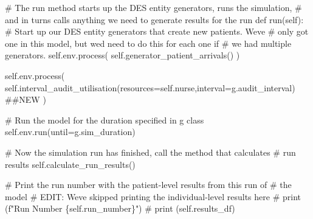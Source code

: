 \documentclass[
  letterpaper,
  DIV=11,
  numbers=noendperiod]{scrreprt}
\newenvironment{Shaded}{\begin{snugshade}}{\end{snugshade}}
\newcommand{\CommentTok}[1]{\textcolor[rgb]{0.37,0.37,0.37}{#1}}
\newcommand{\KeywordTok}[1]{\textcolor[rgb]{0.00,0.23,0.31}{#1}}
\newcommand{\NormalTok}[1]{\textcolor[rgb]{0.00,0.23,0.31}{#1}}
\newcommand{\OperatorTok}[1]{\textcolor[rgb]{0.37,0.37,0.37}{#1}}
\newcommand{\VariableTok}[1]{\textcolor[rgb]{0.07,0.07,0.07}{#1}}
\begin{document}
\begin{Shaded}
\begin{Highlighting}[]
    \CommentTok{\# The run method starts up the DES entity generators, runs the simulation,}
    \CommentTok{\# and in turns calls anything we need to generate results for the run}
        \KeywordTok{def}\NormalTok{ run(}\VariableTok{self}\NormalTok{):}
        \CommentTok{\# Start up our DES entity generators that create new patients.  We\textquotesingle{}ve}
        \CommentTok{\# only got one in this model, but we\textquotesingle{}d need to do this for each one if}
        \CommentTok{\# we had multiple generators.}
        \VariableTok{self}\NormalTok{.env.process(}
          \VariableTok{self}\NormalTok{.generator\_patient\_arrivals()}
\NormalTok{        )}

        \VariableTok{self}\NormalTok{.env.process(}
          \VariableTok{self}\NormalTok{.interval\_audit\_utilisation(resources}\OperatorTok{=}\VariableTok{self}\NormalTok{.nurse,interval}\OperatorTok{=}\NormalTok{g.audit\_interval) }\CommentTok{\#\#NEW}
\NormalTok{        )}

        \CommentTok{\# Run the model for the duration specified in g class}
        \VariableTok{self}\NormalTok{.env.run(until}\OperatorTok{=}\NormalTok{g.sim\_duration)}

        \CommentTok{\# Now the simulation run has finished, call the method that calculates}
        \CommentTok{\# run results}
        \VariableTok{self}\NormalTok{.calculate\_run\_results()}

        \CommentTok{\# Print the run number with the patient{-}level results from this run of}
        \CommentTok{\# the model}
        \CommentTok{\# EDIT: We\textquotesingle{}ve skipped printing the individual{-}level results here}
        \CommentTok{\# print (f"Run Number \{self.run\_number\}")}
        \CommentTok{\# print (self.results\_df)}
\end{Highlighting}
\end{Shaded}
\end{document}

